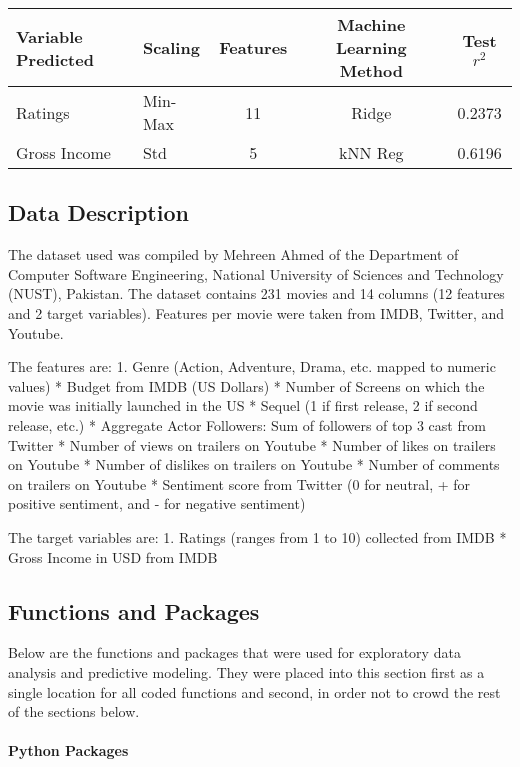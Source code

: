 \documentclass[11pt]{article}
\begin{document}
\begin{longtable}[]{@{}llccc@{}}
\toprule
Variable Predicted & Scaling & Features & Machine Learning Method & Test
\(r^2\)\tabularnewline
\midrule
\endhead
Ratings & Min-Max & 11 & Ridge & 0.2373\tabularnewline
Gross Income & Std & 5 & kNN Reg & 0.6196\tabularnewline
\bottomrule
\end{longtable}

    \subsection{Data Description}\label{data-description}

The dataset used was compiled by Mehreen Ahmed of the Department of
Computer Software Engineering, National University of Sciences and
Technology (NUST), Pakistan. The dataset contains 231 movies and 14
columns (12 features and 2 target variables). Features per movie were
taken from IMDB, Twitter, and Youtube.

The features are: 1. Genre (Action, Adventure, Drama, etc. mapped to
numeric values) * Budget from IMDB (US Dollars) * Number of Screens on
which the movie was initially launched in the US * Sequel (1 if first
release, 2 if second release, etc.) * Aggregate Actor Followers: Sum of
followers of top 3 cast from Twitter * Number of views on trailers on
Youtube * Number of likes on trailers on Youtube * Number of dislikes on
trailers on Youtube * Number of comments on trailers on Youtube *
Sentiment score from Twitter (0 for neutral, + for positive sentiment,
and - for negative sentiment)

The target variables are: 1. Ratings (ranges from 1 to 10) collected
from IMDB * Gross Income in USD from IMDB

    \subsection{Functions and Packages}\label{functions-and-packages}

    Below are the functions and packages that were used for exploratory data
analysis and predictive modeling. They were placed into this section
first as a single location for all coded functions and second, in order
not to crowd the rest of the sections below.

\paragraph{Python Packages}\label{python-packages}
\end{document}
